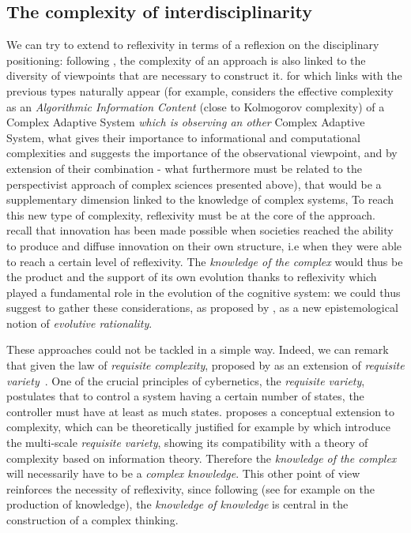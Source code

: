 \subsection{The complexity of interdisciplinarity}


We can try to extend to reflexivity in terms of a reflexion on the disciplinary positioning: following \cite{pumain2005cumulativite}, the complexity of an approach is also linked to the diversity of viewpoints that are necessary to construct it.  for which links with the previous types naturally appear (for example, \cite{gell1995quark} considers the effective complexity as an \emph{Algorithmic Information Content} (close to Kolmogorov complexity) of a Complex Adaptive System \emph{which is observing an other} Complex Adaptive System, what gives their importance to informational and computational complexities and suggests the importance of the observational viewpoint, and by extension of their combination - what furthermore must be related to the perspectivist approach of complex sciences presented above), that would be a supplementary dimension linked to the knowledge of complex systems,
To reach this new type of complexity, reflexivity must be at the core of the approach. \cite{read2009innovation} recall that innovation has been made possible when societies reached the ability to produce and diffuse innovation on their own structure, i.e when they were able to reach a certain level of reflexivity. The \emph{knowledge of the complex} would thus be the product and the support of its own evolution thanks to reflexivity which played a fundamental role in the evolution of the cognitive system: we could thus suggest to gather these considerations, as proposed by , as a new epistemological notion of \emph{evolutive rationality}.


These approaches could not be tackled in a simple way. Indeed, we can remark that given the law of \emph{requisite complexity}, proposed by \cite{gershenson2015requisite} as an extension of \emph{requisite variety}~\cite{ashby1991requisite}. One of the crucial principles of cybernetics, the \emph{requisite variety}, postulates that to control a system having a certain number of states, the controller must have at least as much states. \cite{gershenson2015requisite} proposes a conceptual extension to complexity, which can be theoretically justified for example by \cite{allen2017multiscale} which introduce the multi-scale \emph{requisite variety}, showing its compatibility with a theory of complexity based on information theory. Therefore the \emph{knowledge of the complex} will necessarily have to be a \emph{complex knowledge}. This other point of view reinforces the necessity of reflexivity, since following  (see for example \cite{morin1991methode} on the production of knowledge), the \emph{knowledge of knowledge} is central in the construction of a complex thinking.



